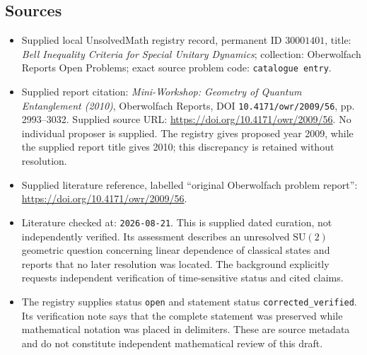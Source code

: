 \documentclass[11pt]{article}
\begin{document}
\subsection{Sources}
\begin{itemize}
\item Supplied local UnsolvedMath registry record, permanent ID \(30001401\), title: \emph{Bell Inequality Criteria for Special Unitary Dynamics}; collection: Oberwolfach Reports Open Problems; exact source problem code: \texttt{catalogue entry}.
\item Supplied report citation: \emph{Mini-Workshop: Geometry of Quantum Entanglement (2010)}, Oberwolfach Reports, DOI \texttt{10.4171/owr/2009/56}, pp. 2993--3032. Supplied source URL: \url{https://doi.org/10.4171/owr/2009/56}. No individual proposer is supplied. The registry gives proposed year 2009, while the supplied report title gives 2010; this discrepancy is retained without resolution.
\item Supplied literature reference, labelled ``original Oberwolfach problem report'': \url{https://doi.org/10.4171/owr/2009/56}.
\item Literature checked at: \texttt{2026-08-21}. This is supplied dated curation, not independently verified. Its assessment describes an unresolved \(\mathrm{SU}(2)\) geometric question concerning linear dependence of classical states and reports that no later resolution was located. The background explicitly requests independent verification of time-sensitive status and cited claims.
\item The registry supplies status \texttt{open} and statement status \texttt{corrected\_verified}. Its verification note says that the complete statement was preserved while mathematical notation was placed in delimiters. These are source metadata and do not constitute independent mathematical review of this draft.
\end{itemize}
\end{document}
